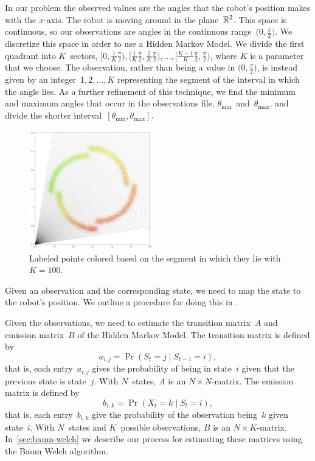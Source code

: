 \documentclass[twoside]{article}
\begin{document}
In our problem the observed values are the angles that the robot's position makes with the $x$-axis.
The robot is moving around in the plane~$\mathbb{R}^2$.
This space is continuous, so our observations are angles in the continuous range~$\big(0, \frac{\pi}{2}\big)$.
We discretize this space in order to use a Hidden Markov Model.
We divide the first quadrant into $K$~sectors, ${\textstyle \big[0, \frac{1}{K}\frac{\pi}{2}\big), \big[\frac{1}{K}\frac{\pi}{2}, \frac{2}{K}\frac{\pi}{2}\big), \ldots, \big[\frac{K - 1}{K}\frac{\pi}{2}, \frac{\pi}{2}\big)}$, where $K$ is a parameter that we choose.
The observation, rather than being a value in $\big(0, \frac{\pi}{2}\big)$, is instead given by an integer~${1, 2, \ldots, K}$ representing the segment of the interval in which the angle lies.
As a further refinement of this technique, we find the minimum and maximum angles that occur in the observations file, $\theta_{\text{min}}$~and~$\theta_{\text{max}}$, and divide the shorter interval~$[\theta_{\text{min}}, \theta_{\text{max}}]$.
\begin{figure}
  \begin{center}
    \includegraphics[width=0.48\textwidth]{images/angle-discrete}
    \caption{Labeled points colored based on the segment in which they lie with~${K = 100}$.}
  \end{center}
\end{figure}

Given an observation and the corresponding state, we need to map the state to the robot's position.
We outline a procedure for doing this in . %

Given the observations, we need to estimate the transition matrix~$A$ and emission matrix~$B$ of the Hidden Markov Model.
The transition matrix is defined by
\begin{equation*}
  a_{i,j} = \Pr(S_{t} = j \mid S_{t-1} = i),
\end{equation*}
that is, each entry~$a_{i, j}$ gives the probability of being in state~$i$ given that the previous state is state~$j$.
With $N$~states, $A$ is an ${N \times N}$-matrix.
The emission matrix is defined by
\begin{equation*}
  b_{i, k} = \Pr(X_t = k \mid S_t = i),
\end{equation*}
that is, each entry~$b_{i, k}$ give the probability of the observation being~$k$ given state~$i$.
With $N$~states and $K$~possible observations, $B$ is an ${N \times K}$-matrix.
In~\cref{sec:baum-welch} we describe our process for estimating these matrices using the Baum Welch algorithm.
\end{document}
